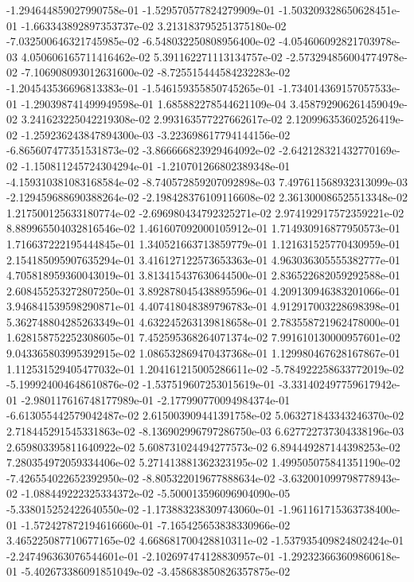 -1.294644859027990758e-01
-1.529570577824279909e-01
-1.503209328650628451e-01
-1.663343892897353737e-02
3.213183795251375180e-02
-7.032500646321745985e-02
-6.548032250808956400e-02
-4.054606092821703978e-03
4.050606165711416462e-02
5.391162271113134757e-02
-2.573294856004774978e-02
-7.106908093012631600e-02
-8.725515444584232283e-02
-1.204543536696813383e-01
-1.546159355850745265e-01
-1.734014369157057533e-01
-1.290398741499949598e-01
1.685882278544621109e-04
3.458792906261459049e-02
3.241623225042219308e-02
2.993163577227662617e-02
2.120996353602526419e-02
-1.259236243847894300e-03
-3.223698617794144156e-02
-6.865607477351531873e-02
-3.866666823929464092e-02
-2.642128321432770169e-02
-1.150811245724304294e-01
-1.210701266802389348e-01
-4.159310381083168584e-02
-8.740572859207092898e-03
7.497611568932313099e-03
-2.129459688690388264e-02
-2.198428376109116608e-02
2.361300086525513348e-02
1.217500125633180774e-02
-2.696980434792325271e-02
2.974192917572359221e-02
8.889965504032816546e-02
1.461607092000105912e-01
1.714930916877950573e-01
1.716637222195444845e-01
1.340521663713859779e-01
1.121631525770430959e-01
2.154185095907635294e-01
3.416127122573653363e-01
4.963036305555382777e-01
4.705818959360043019e-01
3.813415437630644500e-01
2.836522682059292588e-01
2.608455253272807250e-01
3.892878045438895596e-01
4.209130946383201066e-01
3.946841539598290871e-01
4.407418048389796783e-01
4.912917003228698398e-01
5.362748804285263349e-01
4.632245263139818658e-01
2.783558721962478000e-01
1.628158752252308605e-01
7.452595368264071374e-02
7.991610130000957601e-02
9.043365803995392915e-02
1.086532869470437368e-01
1.129980467628167867e-01
1.112531529405477032e-01
1.204161215005286611e-02
-5.784922258633772019e-02
-5.199924004648610876e-02
-1.537519607253015619e-01
-3.331402497759617942e-01
-2.980117616748177989e-01
-2.177990770094984374e-01
-6.613055442579042487e-02
2.615003909441391758e-02
5.063271843343246370e-02
2.718445291545331863e-02
-8.136902996797286750e-03
6.627722737304338196e-03
2.659803395811640922e-02
5.608731024494277573e-02
6.894449287144398253e-02
7.280354972059334406e-02
5.271413881362323195e-02
1.499505075841351190e-02
-7.426554022652392950e-02
-8.805322019677888634e-02
-3.632001099798778943e-02
-1.088449222325334372e-02
-5.500013596096904090e-05
-5.338015252422640550e-02
-1.173883238309743060e-01
-1.961161715363738400e-01
-1.572427872194616660e-01
-7.165425653838330966e-02
3.465225087710677165e-02
4.668681700428810311e-02
-1.537935409824802424e-01
-2.247496363076544601e-01
-2.102697474128830957e-01
-1.292323663609860618e-01
-5.402673386091851049e-02
-3.458683850826357875e-02
